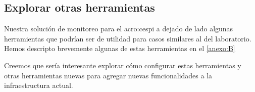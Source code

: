 \subsection{Explorar otras herramientas}
\label{explorar-otras-herramientas}

Nuestra solución de monitoreo para el \gls{acro:cespi} a dejado de lado algunas
herramientas que podrían ser de utilidad para casos similares al del
laboratorio. Hemos descripto brevemente algunas de estas herramientas en el
\autoref{anexo:B}

Creemos que sería interesante explorar cómo configurar estas herramientas y
otras herramientas nuevas para agregar nuevas funcionalidades a la
infraestructura actual.
